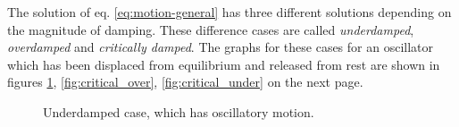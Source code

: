 \documentclass[12pt,a4paper]{article}
\begin{document}
	The solution of eq. \ref{eq:motion-general} has three different solutions depending on the magnitude of damping. These difference cases are called \textit{underdamped}, \textit{overdamped} and \textit{critically damped}. The graphs for these cases for an oscillator which has been displaced from equilibrium and released from rest are shown in figures \ref{fig:underdamped}, \ref{fig:critical_over}, \ref{fig:critical_under} on the next page.
	\begin{figure}[ht]
		\centering
		\caption{Underdamped case, which has oscillatory motion.}
		\label{fig:underdamped}
	\end{figure}
\end{document}
